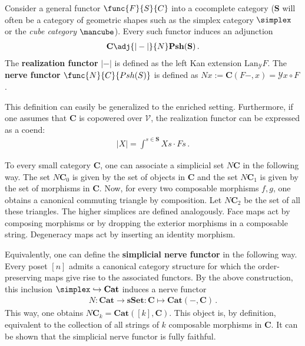     \begin{construct}\label{model:nerve_and_realization}
        Consider a general functor $\func{F}{S}{C}$ into a cocomplete category ($\mathbf{S}$ will often be a category of geometric shapes such as the simplex category $\simplex$ or the \textit{cube category} $\mbox{\mancube}$). Every such functor induces an adjunction
        \begin{gather}
            \mathbf{C}\adj{|-|}{N}\mathbf{Psh}(\mathbf{S})\,.
        \end{gather}
        The \textbf{realization functor} $|-|$ is defined as the left Kan extension $\mathrm{Lan}_{\mathcal{Y}}F$. The \textbf{nerve functor} $\func{N}{C}{Psh(S)}$ is defined as $Nx:=\mathbf{C}(F-,x)=\mathcal{Y}x\circ F$.

        This definition can easily be generalized to the enriched setting. Furthermore, if one assumes that $\mathbf{C}$ is copowered over $\mathcal{V}$, the realization functor can be expressed as a coend:
        \begin{gather}
            |X| = \int^{s\in\mathbf{S}}Xs\cdot Fs\,.
        \end{gather}
    \end{construct}

    \begin{example}\label{model:nerve}
        To every small category $\mathbf{C}$, one can associate a simplicial set $N\mathbf{C}$ in the following way. The set $N\mathbf{C}_0$ is given by the set of objects in $\mathbf{C}$ and the set $N\mathbf{C}_1$ is given by the set of morphisms in $\mathbf{C}$. Now, for every two composable morphisms $f,g$, one obtains a canonical commuting triangle by composition. Let $N\mathbf{C}_2$ be the set of all these triangles. The higher simplices are defined analogously. Face maps act by composing morphisms or by dropping the exterior morphisms in a composable string. Degeneracy maps act by inserting an identity morphism.

        Equivalently, one can define the \textbf{simplicial nerve functor} in the following way. Every poset $[n]$ admits a canonical category structure for which the order-preserving maps give rise to the associated functors. By the above construction, this inclusion $\simplex\hookrightarrow\mathbf{Cat}$ induces a nerve functor
        \begin{gather}
            N:\mathbf{Cat}\rightarrow\mathbf{sSet}:\mathbf{C}\mapsto\mathbf{Cat}(-,\mathbf{C})\,.
        \end{gather}
        This way, one obtains $N\mathbf{C}_k=\mathbf{Cat}([k], \mathbf{C})$. This object is, by definition, equivalent to the collection of all strings of $k$ composable morphisms in $\mathbf{C}$. It can be shown that the simplicial nerve functor is fully faithful.
    \end{example}

